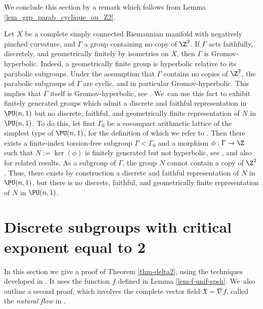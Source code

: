 We conclude this section by a remark which follows from Lemma \ref{lem_grp_parab_cyclique_ou_Z2}.
\begin{remark}
Let $X$ be a complete simply connected Riemannian manifold with negatively pinched curvature, and $\Gamma$ a group containing no copy of $\Z^{2}$. If $\Gamma$ acts faithfully, discretely, and geometrically finitely by isometries on $X$, then $\Gamma$ is Gromov-hyperbolic. Indeed, a geometrically finite group is hyperbolic relative to its parabolic subgroups. Under the assumption that $\Gamma$ contains no copies of $\Z^{2}$, the parabolic subgroups of $\Gamma$ are cyclic, and in particular Gromov-hyperbolic. This implies that $\Gamma$ itself is Gromov-hyperbolic, see \cite{osinRelativelyHyperbolicGroups2006}. We~can use this fact to exhibit finitely generated groups which admit a discrete and faithful representation in $\PU(n,1)$ but no discrete, faithful, and geometrically finite representation of $N$ in $\PU(n,1)$. To do this, let first $\Gamma_0$ be a cocompact arithmetic lattice of the simplest type of $\PU(n,1)$, for the definition of which we refer to \cite[\S VIII.5]{borelContinuousCohomologyDiscrete2000}. Then there exists a finite-index torsion-free subgroup $\Gamma<\Gamma_0$ and a morphism $\phi:\Gamma \to \Z$ such that $N:=\ker(\phi)$ is finitely generated but not hyperbolic, see \cite{llosaisenrichSubgroupsHyperbolicGroups2024}, and also \cite{italianoHyperbolic5manifoldsThat2023-manuel} for related results. As a subgroup of $\Gamma$, the group $N$ cannot contain a copy of $\Z^{2}$. Thus, there exists by construction a discrete and faithful representation of $N$ in $\PU(n,1)$, but there is no discrete, faithful, and geometrically finite representation of $N$ in $\PU(n,1)$.
\end{remark}

\section{Discrete subgroups with critical exponent equal to 2}\label{section-delta2}

In this section we give a proof of Theorem \ref{thm-delta2}, using the techniques developed in \cite{connellNaturalFlowCritical2023}. It uses the function $f$ defined in Lemma \ref{lem-f-unif-spsh}. We~also outline a second proof, which involves the complete vector field $\mathfrak{X}=\nabla{f}$, called the \textit{natural flow} in \cite{connellNaturalFlowCritical2023}.

